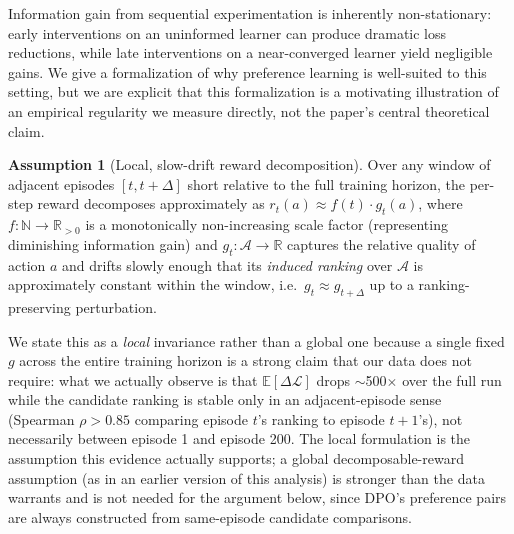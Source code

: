 \documentclass{article}
\theoremstyle{plain}
\theoremstyle{definition}
\newtheorem{assumption}[theorem]{Assumption}
\theoremstyle{remark}
\begin{document}
Information gain from sequential experimentation is inherently non-stationary: early interventions on an uninformed learner can produce dramatic loss reductions, while late interventions on a near-converged learner yield negligible gains. We give a formalization of why preference learning is well-suited to this setting, but we are explicit that this formalization is a motivating illustration of an empirical regularity we measure directly, not the paper's central theoretical claim.

\begin{assumption}[Local, slow-drift reward decomposition]
\label{ass:diminish}
Over any window of adjacent episodes $[t, t+\Delta]$ short relative to the full training horizon, the per-step reward decomposes approximately as $r_t(a) \approx f(t) \cdot g_t(a)$, where $f: \mathbb{N} \to \mathbb{R}_{>0}$ is a monotonically non-increasing scale factor (representing diminishing information gain) and $g_t: \mathcal{A} \to \mathbb{R}$ captures the relative quality of action $a$ and drifts slowly enough that its \emph{induced ranking} over $\mathcal{A}$ is approximately constant within the window, i.e.\ $g_t \approx g_{t+\Delta}$ up to a ranking-preserving perturbation.
\end{assumption}

We state this as a \emph{local} invariance rather than a global one because a single fixed $g$ across the entire training horizon is a strong claim that our data does not require: what we actually observe is that $\mathbb{E}[\Delta\mathcal{L}]$ drops $\sim$500$\times$ over the full run while the candidate ranking is stable only in an adjacent-episode sense (Spearman $\rho > 0.85$ comparing episode $t$'s ranking to episode $t+1$'s), not necessarily between episode 1 and episode 200. The local formulation is the assumption this evidence actually supports; a global decomposable-reward assumption (as in an earlier version of this analysis) is stronger than the data warrants and is not needed for the argument below, since DPO's preference pairs are always constructed from same-episode candidate comparisons.
\end{document}
